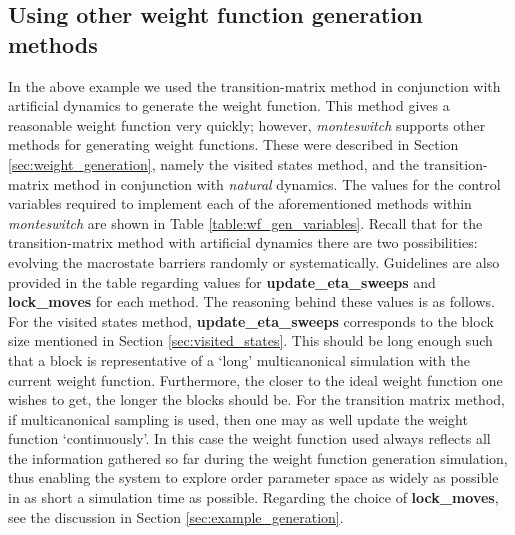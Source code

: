 \documentclass{report}
\begin{document}
\subsection{Using other weight function generation methods}
In the above example we used the transition-matrix method in conjunction with artificial dynamics to generate the weight function. This method gives a 
reasonable weight function very quickly; however, \emph{monteswitch} supports other methods for generating weight functions. These were described in 
Section \ref{sec:weight_generation}, namely the visited states method, and the transition-matrix method in conjunction with \emph{natural} dynamics.
The values for the control variables required to implement each of the aforementioned methods within \emph{monteswitch} are shown in Table 
\ref{table:wf_gen_variables}. Recall that for the transition-matrix method with artificial dynamics there are two possibilities: evolving the
macrostate barriers randomly or systematically.
Guidelines are also provided in the table regarding values for \textbf{update\_eta\_sweeps} and
\textbf{lock\_moves} for each method. The reasoning behind these values is as follows. 
For the visited states method, \textbf{update\_eta\_sweeps} corresponds to the block size mentioned in
Section \ref{sec:visited_states}. This should be long enough such that a block is representative of a `long' multicanonical simulation with the 
current weight function. Furthermore, the closer to the ideal weight function one wishes to get, the longer the blocks should be.
For the transition matrix method, if multicanonical sampling is used, then one may as well update the weight function `continuously'. In this case
the weight function used always reflects all the information gathered so far during the weight function generation simulation, thus enabling the
system to explore order parameter space as widely as possible in as short a simulation time as possible. Regarding the choice of
\textbf{lock\_moves}, see the discussion in Section \ref{sec:example_generation}.
\end{document}
